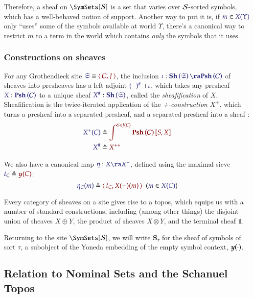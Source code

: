 \documentclass[11pt]{article}
\theoremstyle{definition}
\theoremstyle{remark}
\numberwithin{equation}{section}
\newcommand\Sheaves[1]{\mathbf{Sh}\left(#1\right)}
\newcommand\Presheaves[1]{\mathbf{Psh}\left(#1\right)}
\newcommand\Sheafify[1]{#1^{\#}}
\newcommand\SCtxSite{\SymSets[\Sorts]}
\begin{document}
Therefore, a sheaf on $\SCtxSite$ is a set that varies over $\mathcal{S}$-sorted
symbols, which has a well-behaved notion of support. Another way to put it is,
if $\Member{m}{X(\Upsilon)}$ only ``uses'' some of the symbols available at
world $\Upsilon$, there's a canonical way to restrict $m$ to a term in the
world which contains \emph{only} the symbols that it uses.

\subsubsection{Constructions on sheaves}

For any Grothendieck site $\Match{\mathfrak{S}}{\Pair{\mathcal{C}}{J}}$, the
inclusion $\Of{\iota}{\Sheaves{\mathfrak{S}}\ra\Presheaves{\mathcal{C}}}$ of
sheaves into presheaves has a left adjoint
$\IMode{\Sheafify{(-)}}\dashv\IMode{\iota}$, which takes any presheaf
$\Of{X}{\Presheaves{\mathcal{C}}}$ to a unique sheaf
$\Of{\Sheafify{X}}{\Sheaves{\mathfrak{S}}}$, called the \emph{sheafification}
of $X$. Sheafification is the twice-iterated application of the
\emph{+-construction} $X^+$, which turns a presheaf into a separated presheaf,
and a separated presheaf into a sheaf \cite{mac-lane-moerdijk:1992}:
\begin{align*}
  \ADefine{
    X^+(C)
  }{
    \int^{S\in J(C)}
    \Hom{\Presheaves{\mathcal{C}}}{S}{X}
  }\\
  \ADefine{
    \Sheafify{X}
  }{
    X^{++}
  }
\end{align*}

We also have a canonical map $\Of{\eta}{X\ra X^+}$, defined
using the maximal sieve $\Define{t_C}{\Yoneda{C}}$:
\[
  \HypJ{
    \Define{\eta_C(m)}{
      \Pair{t_C}{
        X(-)(m)
      }
    }
  }{
    \Member{m}{X(C)}
  }
\]


Every category of sheaves on a site gives rise to a topos, which equips us with
a number of standard constructions, including (among other things) the disjoint
union of sheaves $X\oplus Y$, the product of sheaves $X\otimes Y$, and the terminal sheaf $\mathbb{1}$.

Returning to the site $\SCtxSite$, we will write $\mathbf{S}_\tau$ for the sheaf
of symbols of sort $\tau$, a subobject of the Yoneda embedding of the empty
symbol context, $\boldsymbol{y} (\cdot)$.

\subsection{Relation to Nominal Sets and the Schanuel Topos}
\end{document}
